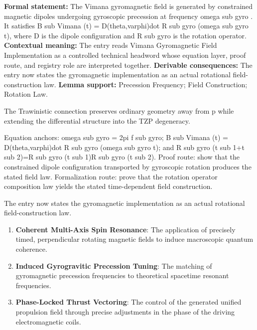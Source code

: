 \begingroup\footnotesize\setlength{\emergencystretch}{3em}\sloppy
\textbf{Formal statement:} The Vimana gyromagnetic field is generated by constrained magnetic dipoles undergoing gyroscopic precession at frequency omega sub gyro . It satisfies B sub Vimana (t) = D(theta,varphi)dot R sub gyro (omega sub gyro t), where D is the dipole configuration and R sub gyro is the rotation operator. \textbf{Contextual meaning:} The entry reads Vimana Gyromagnetic Field Implementation as a controlled technical headword whose equation layer, proof route, and registry role are interpreted together. \textbf{Derivable consequences:} The entry now states the gyromagnetic implementation as an actual rotational field-construction law. \textbf{Lemma support:} Precession Frequency; Field Construction; Rotation Law.\par
\endgroup

The Trawinistic connection preserves ordinary geometry away from p while extending the differential structure into the TZP degeneracy.

Equation anchors: omega sub gyro = 2pi f sub gyro; B sub Vimana (t) = D(theta,varphi)dot R sub gyro (omega sub gyro t); and R sub gyro (t sub 1+t sub 2)=R sub gyro (t sub 1)R sub gyro (t sub 2). Proof route: show that the constrained dipole configuration transported by gyroscopic rotation produces the stated field law. Formalization route: prove that the rotation operator composition law yields the stated time-dependent field construction.

The entry now states the gyromagnetic implementation as an actual rotational field-construction law.
\endgroup

\begin{enumerate}[leftmargin=1.6em,itemsep=6pt,topsep=4pt]
\item \textbf{Coherent Multi-Axis Spin Resonance}: The application of precisely timed, perpendicular rotating magnetic fields to induce macroscopic quantum coherence.
\item \textbf{Induced Gyrogravitic Precession Tuning}: The matching of gyromagnetic precession frequencies to theoretical spacetime resonant frequencies.
\item \textbf{Phase-Locked Thrust Vectoring}: The control of the generated unified propulsion field through precise adjustments in the phase of the driving electromagnetic coils.
\end{enumerate}


